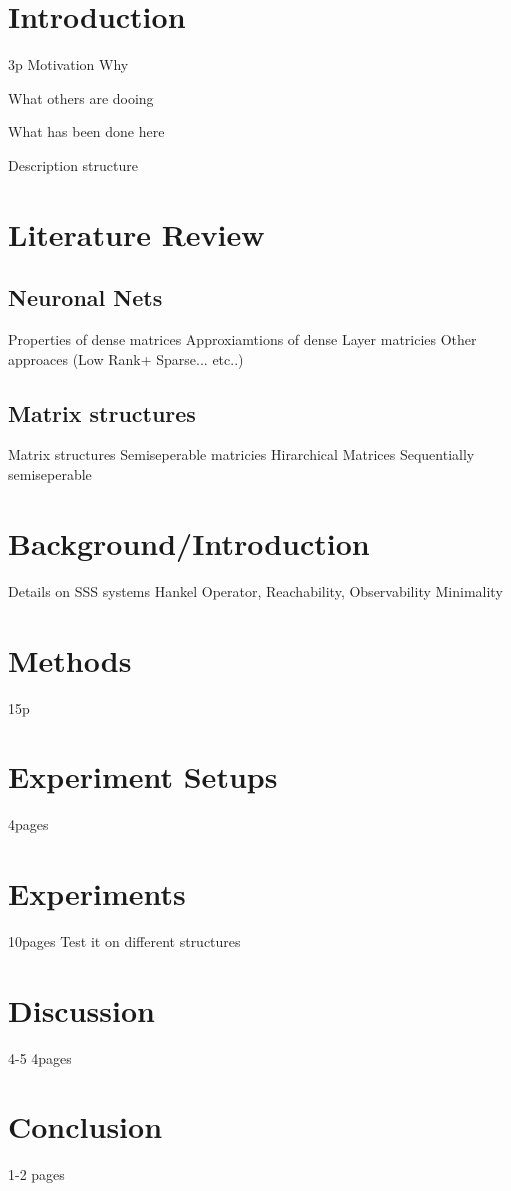 


\chapter{Introduction} 3p
Motivation Why

What others are dooing

What has been done here


Description structure


\chapter{Literature Review}
\section{Neuronal Nets}
Properties of dense matrices
Approxiamtions of dense Layer matricies
Other approaces (Low Rank+ Sparse... etc..)

\section{Matrix structures}
Matrix structures
Semiseperable matricies
Hirarchical Matrices
Sequentially semiseperable


\chapter{Background/Introduction}
Details on SSS systems
Hankel Operator, Reachability, Observability
Minimality


\chapter{Methods} 15p

\chapter{Experiment Setups}
4pages

\chapter{Experiments}
10pages
Test it on different structures

\chapter{Discussion}
4-5 4pages

\chapter{Conclusion}
1-2 pages
